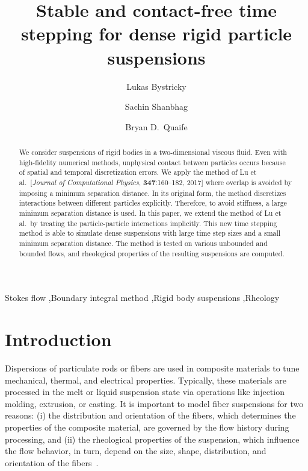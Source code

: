 \documentclass[preprint, 10pt]{elsarticle}
\begin{document}
\title{Stable and contact-free time stepping for dense rigid particle
suspensions}

\author[Lukas]{Lukas Bystricky}
\author[Lukas]{Sachin Shanbhag}
\author[Bryan]{Bryan D.~Quaife}
\address[Lukas]{Department of Scientific Computing, Florida State University,
Tallahassee, FL, 32306.}
\address[Bryan]{Department of Scientific Computing and Geophysical Fluid
Dynamics Institute, Florida State University, Tallahassee, FL, 32306.}

\begin{abstract} 
We consider suspensions of rigid bodies in a two-dimensional viscous
fluid. Even with high-fidelity numerical methods, unphysical contact
between particles occurs because of spatial and temporal discretization
errors.  We apply the method of Lu et al.~[{\em Journal of Computational
Physics}, {\bf 347}:160--182, 2017] where overlap is avoided by
imposing a minimum separation distance.  In its original form, the
method discretizes interactions between different particles explicitly.
Therefore, to avoid stiffness, a large minimum separation distance is
used.  In this paper, we extend the method of Lu et al.~by treating the
particle-particle interactions implicitly.  This new time stepping
method is able to simulate dense suspensions with large time step sizes
and a small minimum separation distance.  The method is tested on
various unbounded and bounded flows, and rheological properties of the
resulting suspensions are computed.

\end{abstract}

\begin{keyword}
  Stokes flow \sep Boundary integral method \sep Rigid body suspensions
  \sep Rheology 
\end{keyword}

\maketitle


\section{Introduction\label{s:intro}}
Dispersions of particulate rods or fibers are used in composite
materials to tune mechanical, thermal, and electrical properties.
Typically, these materials are processed in the melt or liquid
suspension state via operations like injection molding, extrusion,
or casting. It is important to model fiber suspensions for two
reasons: (i) the distribution and orientation of the fibers, which
determines the properties of the composite material, are governed by the
flow history during processing, and (ii) the rheological properties of
the suspension, which influence the flow behavior, in turn, depend on
the size, shape, distribution, and orientation of the
fibers~\cite{larsoncf}.
\end{document}
